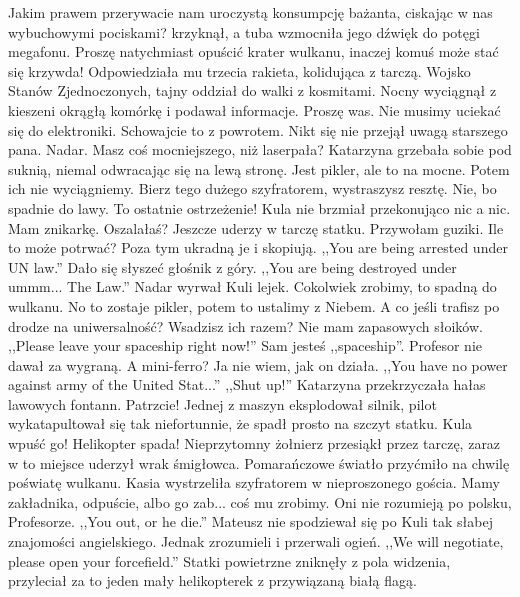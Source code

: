 \begin{dialogue}
\ds{} Jakim prawem przerywacie nam uroczystą konsumpcję bażanta, ciskając w nas wybuchowymi pociskami? \dm{}
krzyknął, a tuba wzmocniła jego dźwięk do potęgi megafonu. \dm{}
Proszę natychmiast opuścić krater wulkanu, inaczej komuś może stać się krzywda! \dm{} Odpowiedziała mu trzecia rakieta, kolidująca z tarczą.
\ds{} Wojsko Stanów Zjednoczonych, tajny oddział do walki z kosmitami. \dm{} Nocny wyciągnął z kieszeni okrągłą komórkę i podawał informacje.
\ds{} Proszę was. Nie musimy uciekać się do elektroniki. Schowajcie to z powrotem. \dm{} Nikt się nie przejął uwagą starszego pana.
\ds{} Nadar. Masz coś mocniejszego, niż laserpała? \dm{} Katarzyna grzebała sobie pod suknią, niemal odwracając się na lewą stronę.
\ds{} Jest pikler, ale to na mocne. Potem ich nie wyciągniemy.
\ds{} Bierz tego dużego szyfratorem, wystraszysz resztę.
\ds{} Nie, bo spadnie do lawy.
\ds{} To ostatnie ostrzeżenie! \dm{} Kula nie brzmiał przekonująco nic a nic.
\ds{} Mam znikarkę.
\ds{} Oszalałaś? Jeszcze uderzy w tarczę statku. Przywołam guziki.
\ds{} Ile to może potrwać? Poza tym ukradną je i skopiują.
\ds{} ,,You are being arrested under UN law.'' \dm{} Dało się słyszeć głośnik z góry.
\ds{} ,,You are being destroyed under ummm... The Law.'' \dm{} Nadar wyrwał Kuli lejek.
\ds{} Cokolwiek zrobimy, to spadną do wulkanu.
\ds{} No to zostaje pikler, potem to ustalimy z Niebem.
\ds{} A co jeśli trafisz po drodze na uniwersalność? Wsadzisz ich razem? Nie mam zapasowych słoików.
\ds{} ,,Please leave your spaceship right now!''
\ds{} Sam jesteś ,,spaceship''. \dm{} Profesor nie dawał za wygraną.
\ds{} A mini-ferro?
\ds{} Ja nie wiem, jak on działa.
\ds{} ,,You have no power against army of the United Stat...''
\ds{} ,,Shut up!'' \dm{} Katarzyna przekrzyczała hałas lawowych fontann. 
\ds{} Patrzcie! \dm{} Jednej z maszyn eksplodował silnik, pilot wykatapultował się tak niefortunnie, że spadł prosto na szczyt statku.
\ds{} Kula wpuść go! Helikopter spada! \dm{} Nieprzytomny żołnierz przesiąkł przez tarczę, zaraz w to miejsce uderzył wrak śmigłowca. 
Pomarańczowe światło przyćmiło na chwilę poświatę wulkanu. Kasia wystrzeliła szyfratorem w nieproszonego gościa.
\ds{} Mamy zakładnika, odpuście, albo go zab... coś mu zrobimy.
\ds{} Oni nie rozumieją po polsku, Profesorze.
\ds{} ,,You out, or he die.'' \dm{} Mateusz nie spodziewał się po Kuli tak słabej znajomości angielskiego. Jednak zrozumieli i przerwali ogień.
\ds{} ,,We will negotiate, please open your forcefield.'' \dm{} Statki powietrzne zniknęły z pola widzenia, przyleciał za to jeden mały helikopterek z przywiązaną białą flagą.

\end{dialogue}
